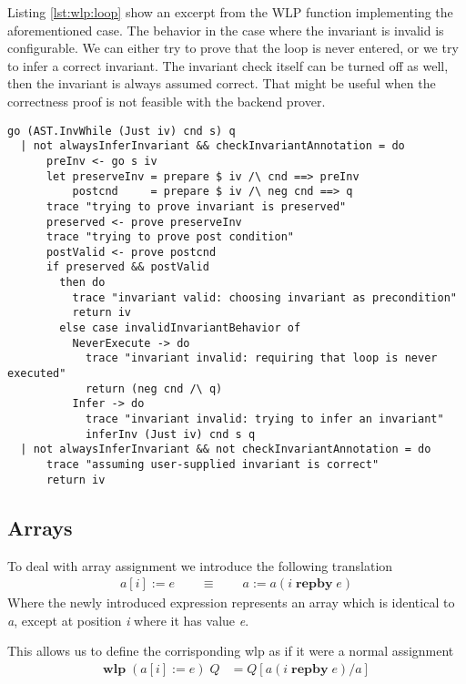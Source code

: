 \documentclass[]{scrartcl}
\newcommand{\WLP}[2]{\ensuremath{\mathbf{wlp}\;#1\;#2}}
\newcommand{\REPBY}[2]{\ensuremath{#1\;\mathbf{repby}\;#2}}
\begin{document}
Listing \ref{lst:wlp:loop} show an excerpt from the WLP function implementing the aforementioned case.
The behavior in the case where the invariant is invalid is configurable. We can either try to prove
that the loop is never entered, or we try to infer a correct invariant.
The invariant check itself can be turned off as well, then the invariant is always assumed correct.
That might be useful when the correctness proof is not feasible with the backend prover.

\begin{lstlisting}[caption=WLP loop case, label=lst:wlp:loop]
go (AST.InvWhile (Just iv) cnd s) q
  | not alwaysInferInvariant && checkInvariantAnnotation = do
      preInv <- go s iv
      let preserveInv = prepare $ iv /\ cnd ==> preInv
          postcnd     = prepare $ iv /\ neg cnd ==> q  
      trace "trying to prove invariant is preserved"
      preserved <- prove preserveInv
      trace "trying to prove post condition"
      postValid <- prove postcnd
      if preserved && postValid
        then do
          trace "invariant valid: choosing invariant as precondition"
          return iv
        else case invalidInvariantBehavior of
          NeverExecute -> do
            trace "invariant invalid: requiring that loop is never executed"
            return (neg cnd /\ q)
          Infer -> do
            trace "invariant invalid: trying to infer an invariant"
            inferInv (Just iv) cnd s q
  | not alwaysInferInvariant && not checkInvariantAnnotation = do
      trace "assuming user-supplied invariant is correct"
      return iv
\end{lstlisting}


\subsection{Arrays}

To deal with array assignment we introduce the following translation
\begin{align}
  a[i] := e \qquad \equiv \qquad a := a ( \REPBY{i}{e} )
\end{align}
Where the newly introduced expression represents an array which is identical to
\emph{a}, except at position \emph{i} where it has value \emph{e}.

This allows us to define the corrisponding wlp as if it were a normal assignment
\begin{align}
  \WLP{(a[i] := e)}{Q} &= Q[a( \REPBY{i}{e} ) / a]
\end{align}
\end{document}
